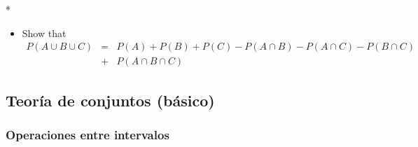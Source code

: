 \begin{Quest}*
\begin{itemize}
\item[d) ] Show that
\begin{eqnarray*}
P(A\cup B\cup C) &=& P(A)+P(B)+P(C)-P(A\cap B)-P(A\cap C)-P(B\cap C)\\
&+& P(A\cap B\cap C)
\end{eqnarray*}

\end{itemize}
\end{Quest}


\newpage


\subsection{Teor\'ia de conjuntos (b\'asico)}

\subsubsection*{Operaciones entre intervalos}

